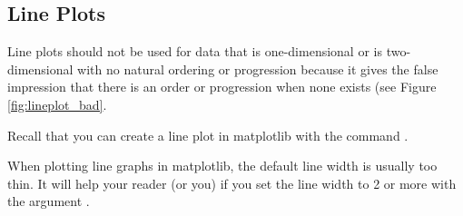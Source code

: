 \subsection*{Line Plots}

Line plots should not be used for data that is one-dimensional or is two-dimensional with no natural ordering or progression because it gives the false impression that there is an order or progression when none exists (see Figure \ref{fig:lineplot_bad}.

Recall that you can create a line plot in matplotlib with the command .

When plotting line graphs in matplotlib, the default line width is usually too thin.  It will help your reader (or you) if you set the line width to 2 or more with the argument .



